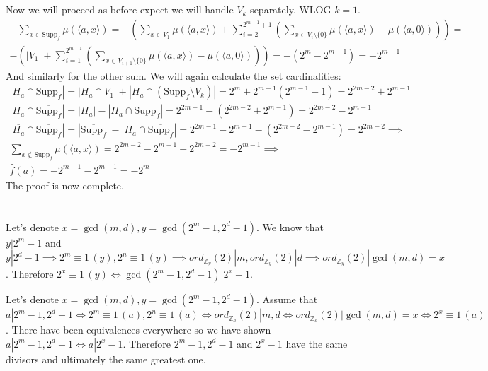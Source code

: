 \documentclass[12pt, a4paper]{article}
\begin{document}
Now we will proceed as before expect we will handle $V_k$ separately. WLOG $k = 1$. 
\begin{gather*}
-\sum\limits_{x \in \text{Supp}_f} \mu(\langle a,x \rangle) = -(\sum\limits_{x \in V_1}\mu(\langle a,x \rangle) + \sum\limits_{i = 2}^{2^{m-1}+1} \left( \sum\limits_{x \in V_i \setminus\{0\}} \mu(\langle a,x \rangle) - \mu(\langle a,0 \rangle) \right)) = \\
-(|V_1| + \sum\limits_{i = 1}^{2^{m-1}} \left( \sum\limits_{x \in V_{i+1} \setminus\{0\}} \mu(\langle a,x \rangle) - \mu(\langle a,0 \rangle) \right)) = -(2^m - 2^{m-1}) = -2^{m-1}
\end{gather*}
And similarly for the other sum. We will again calculate the set cardinalities:
\begin{gather*}
|H_a \cap \text{Supp}_f| = |H_a \cap V_1 | + |H_a \cap (\text{Supp}_f \setminus V_k)| = 2^m + 2^{m-1}(2^{m-1}-1) = 2^{2m-2}+2^{m-1}\\
|H_a \cap \overline{\text{Supp}_f}| = |H_a|-|H_a \cap \text{Supp}_f| = 2^{2m-1} - (2^{2m-2}+2^{m-1}) = 2^{2m-2}-2^{m-1}\\
|\overline{H_a} \cap \overline{\text{Supp}_f}| = |\overline{\text{Supp}_f}|-|H_a \cap \overline{\text{Supp}_f}| = 2^{2m-1}-2^{m-1}-(2^{2m-2}-2^{m-1}) = 2^{2m-2}\implies\\
\sum\limits_{x \notin \text{Supp}_f} \mu(\langle a,x \rangle) =  2^{2m-2}-2^{m-1} - 2^{2m-2} = -2^{m-1} \implies\\
\hat{f}(a) = -2^{m-1} - 2^{m-1} = -2^m
\end{gather*}
The proof is now complete.


\section{}
Let's denote $x = \gcd(m,d), y = \gcd(2^m-1, 2^d-1)$. We know that $y | 2^m-1$ and $y | 2^d-1 \implies 2^m \equiv 1 \, (y), 2^n \equiv 1 \, (y) \implies ord_{\mathbb{Z}_y}(2)|m, ord_{\mathbb{Z}_y}(2)|d \implies ord_{\mathbb{Z}_y}(2)|\gcd(m,d)=x$. Therefore $2^x \equiv 1 \, (y) \iff \gcd(2^m-1, 2^d-1) | 2^x-1$.

Let's denote $x = \gcd(m,d), y = \gcd(2^m-1, 2^d-1)$. Assume that $a | 2^m-1, 2^d-1 \iff 2^m \equiv 1 \, (a), 2^n \equiv 1 \, (a) \iff ord_{\mathbb{Z}_a}(2)|m,d \iff ord_{\mathbb{Z}_a}(2)|\gcd(m,d)=x \iff 2^x \equiv 1 \, (a)$. There have been equivalences everywhere so we have shown $a | 2^m-1, 2^d-1 \iff a | 2^x-1$. Therefore $ 2^m-1, 2^d-1$ and $2^x-1$ have the same divisors and ultimately the same greatest one.
\end{document}
